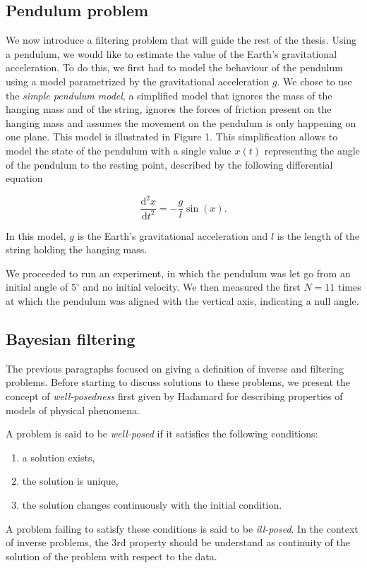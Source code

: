 \subsection{Pendulum problem}

We now introduce a filtering problem that will guide the rest of the thesis. Using a pendulum, we would like to estimate the value of the Earth's gravitational acceleration. To do this, we first had to model the behaviour of the pendulum using a model parametrized by the gravitational acceleration $g$. We chose to use the \textit{simple pendulum model}, a simplified model that ignores the mass of the hanging mass and of the string, ignores the forces of friction present on the hanging mass and assumes the movement on the pendulum is only happening on one plane. This model is illustrated in Figure 1. This simplification allows to model the state of the pendulum with a single value $x(t)$ representing the angle of the pendulum to the resting point, described by the following differential equation

\begin{equation}
  \frac{\text{d}^2x}{\text{d}t^2} = -\frac{g}{l}\sin(x).
\end{equation}

In this model, $g$ is the Earth's gravitational acceleration and $l$ is the length of the string holding the hanging mass.

We proceeded to run an experiment, in which the pendulum was let go from an initial angle of $5^\circ$ and no initial velocity. We then measured the first $N = 11$ times at which the pendulum was aligned with the vertical axis, indicating a null angle.

\subsection{Bayesian filtering}

The previous paragraphs focused on giving a definition of inverse and filtering problems. Before starting to discuss solutions to these problems, we present the concept of \textit{well-posedness} first given by Hadamard for describing properties of models of physical phenomena.

\begin{definition} A problem is said to be \textit{well-posed} if it satisfies the following conditions:
  \begin{enumerate}
  \item{a solution exists,}
  \item{the solution is unique,}
  \item{the solution changes continuously with the initial condition.}
  \end{enumerate}

  A problem failing to satisfy these conditions is said to be \textit{ill-posed}. In the context of inverse problems, the 3rd property should be understand as continuity of the solution of the problem with respect to the data.  
\end{definition}


